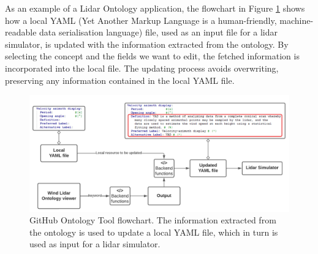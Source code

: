 \documentclass[remotesensing,article,submit,pdftex,moreauthors]{Definitions/mdpi}
\begin{document}

As an example of a Lidar Ontology application, the flowchart in Figure \ref{fig:workflow_GHT} shows how a local YAML (Yet Another Markup Language is a human-friendly, machine-readable data serialisation language) file, used as an input file for a lidar simulator, is updated with the information extracted from the ontology. By selecting the concept and the fields we want to edit, the fetched information is incorporated into the local file. The updating process avoids overwriting, preserving any information contained in the local YAML file.

\begin{figure}[htpb!]
    \centering
    \includegraphics[width=\textwidth]{Figures/flowchart_GH_Tool.png}
    \caption{GitHub Ontology Tool flowchart. The information extracted from the ontology is used to update a local YAML file, which in turn is used as input for a lidar simulator.  }
    \label{fig:workflow_GHT}
\end{figure}
    
\end{document}
